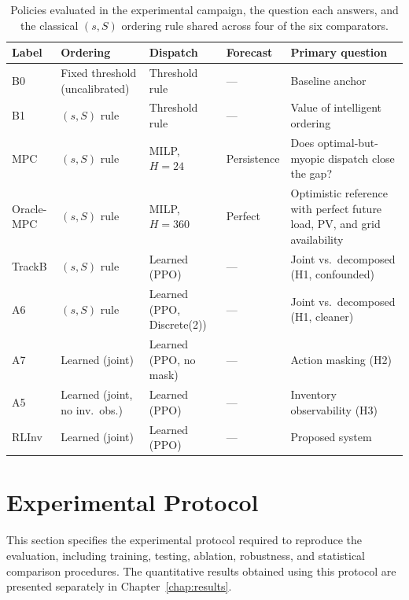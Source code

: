 \begin{table}[htb]
\centering
\small
\caption{Policies evaluated in the experimental campaign, the question
each answers, and the classical $(s,S)$ ordering rule shared across four
of the six comparators.}
\label{tab:ablation-design}
\begin{tabularx}{\textwidth}{
    >{\raggedright\arraybackslash}p{1.4cm}
    >{\raggedright\arraybackslash}p{2.15cm}
    >{\raggedright\arraybackslash}p{2.25cm}
    >{\raggedright\arraybackslash}p{2.0cm}
    >{\raggedright\arraybackslash}X
}
\toprule
\textbf{Label} &
\textbf{Ordering} &
\textbf{Dispatch} &
\textbf{Forecast} &
\textbf{Primary question} \\
\midrule
B0 &
Fixed threshold (uncalibrated) &
Threshold rule &
--- &
Baseline anchor \\
B1 &
$(s,S)$ rule &
Threshold rule &
--- &
Value of intelligent ordering \\
MPC &
$(s,S)$ rule &
MILP, $H{=}24$ &
Persistence &
Does optimal-but-myopic dispatch close the gap? \\
Oracle-MPC &
$(s,S)$ rule &
MILP, $H{=}360$ &
Perfect &
Optimistic reference with perfect future load, PV, and grid availability \\
TrackB &
$(s,S)$ rule &
Learned (PPO) &
--- &
Joint vs.\ decomposed (H1, confounded) \\
A6 &
$(s,S)$ rule &
Learned (PPO, Discrete(2)) &
--- &
Joint vs.\ decomposed (H1, cleaner) \\
A7 &
Learned (joint) &
Learned (PPO, no mask) &
--- &
Action masking (H2) \\
A5 &
Learned (joint, no inv.\ obs.) &
Learned (PPO) &
--- &
Inventory observability (H3) \\
RLInv &
Learned (joint) &
Learned (PPO) &
--- &
Proposed system \\
\bottomrule
\end{tabularx}
\end{table}


\section{Experimental Protocol}
\label{sec:evaluation_protocol}
This section specifies the experimental protocol required to reproduce
the evaluation, including training, testing, ablation, robustness, and
statistical comparison procedures. The quantitative results obtained
using this protocol are presented separately in
Chapter~\ref{chap:results}.

